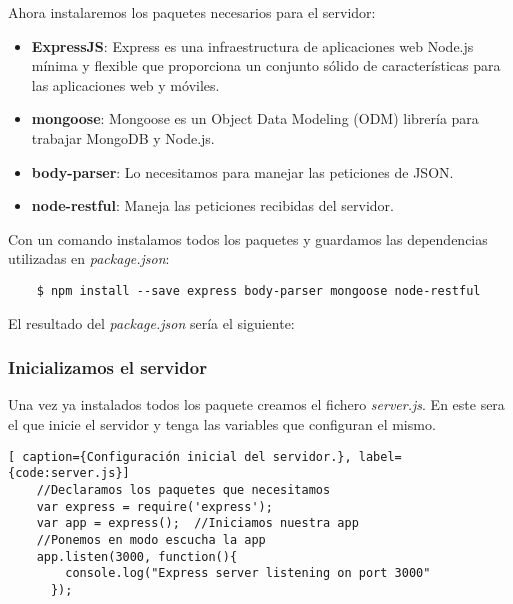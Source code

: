 Ahora instalaremos los paquetes necesarios para el servidor:

\begin{itemize}
    \item \textbf{ExpressJS}: Express es una infraestructura de aplicaciones web Node.js mínima y flexible que proporciona un conjunto sólido de características para las aplicaciones web y móviles.
    \item \textbf{mongoose}: Mongoose es un Object Data Modeling (ODM) librería para trabajar MongoDB y Node.js.
    \item \textbf{body-parser}: Lo necesitamos para manejar las peticiones de JSON.
    \item \textbf{node-restful}: Maneja las peticiones recibidas del servidor.
\end{itemize}

Con un comando instalamos todos los paquetes y guardamos las dependencias utilizadas en \textit{package.json}:

\begin{lstlisting}
    $ npm install --save express body-parser mongoose node-restful
\end{lstlisting}

El resultado del \textit{package.json} sería el siguiente:



\subsubsection{Inicializamos el servidor}

Una vez ya instalados todos los paquete creamos el fichero \textit{server.js}. En este sera el que inicie el servidor y tenga las variables que configuran el mismo. 

\begin{lstlisting}[ caption={Configuración inicial del servidor.}, label={code:server.js}]
    //Declaramos los paquetes que necesitamos
    var express = require('express');  
    var app = express();  //Iniciamos nuestra app
    //Ponemos en modo escucha la app
    app.listen(3000, function(){
        console.log("Express server listening on port 3000"
      });

\end{lstlisting}

